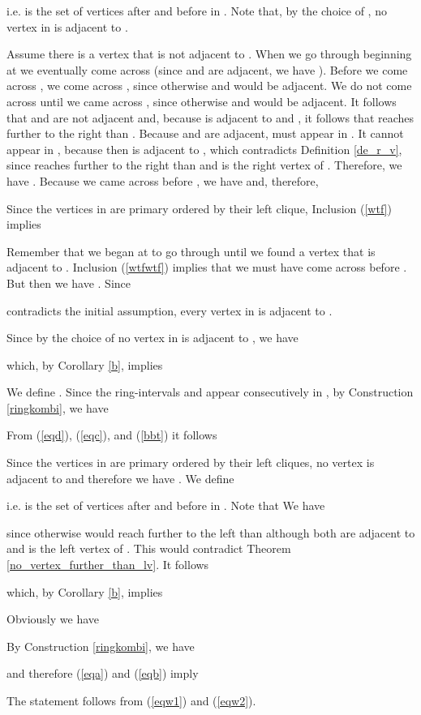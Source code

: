 \documentclass[10pt]{article}
\newenvironment{proof}{\noindent{\bf Proof~}}{\null\hfill \par\medskip}
\newcommand{\ssref}[1]{(\ref{#1})}
\begin{document}
\begin{proof}
i.e.  is the set of vertices after  and before  in .
Note that, by the choice of , no vertex in  is adjacent to .

Assume there is a vertex  that is not adjacent to .
When we go through  beginning at  we eventually come across  
(since  and  are adjacent, we have ).
Before we come across , we come across , since otherwise  and  would be adjacent.
We do not come  across  until we came across , since otherwise  and  would be adjacent.
It follows that  and  are not adjacent and, because  is adjacent to   and , it follows that  reaches further to the right than .
Because  and  are adjacent,  
must appear in .
It cannot appear in , because then  
is adjacent to ,
which contradicts Definition \ref{de_r_v}, since  reaches further to the right 
than  and  is the right vertex of .
Therefore, we have
.
Because we came across  before , we have  and, therefore,

Since the vertices in  are primary ordered by their left clique, Inclusion (\ref{wtf}) implies

Remember that we began at  
to go through  until we found a vertex  that is adjacent to .
Inclusion \ssref{wtfwtf} implies that we must  have come across  before .
But then we have .
Since
 
contradicts the initial assumption, every vertex in  is adjacent to .



Since by the choice of  no vertex in  is adjacent to , we have

which, by Corollary \ref{b}, implies

We define .
Since the ring-intervals  and  appear consecutively in , 
by Construction \ref{ringkombi}, we have

From \ssref{eqd}, \ssref{eqc}, and \ssref{bbt} it follows


Since the vertices in  are primary ordered by their left cliques, 
no vertex   is adjacent 
to  and therefore we have . We define

i.e.  is the set of vertices after  and before  in .
Note that 
We have

since otherwise  would reach further to the left than  although both are 
adjacent to  and  is the left vertex of .
This would contradict Theorem \ref{no_vertex_further_than_lv}.
It follows

which, by Corollary \ref{b}, implies 

Obviously we have 

By Construction \ref{ringkombi}, we have 

and therefore \ssref{eqa} and \ssref{eqb} imply 

The statement follows from \ssref{eqw1} and \ssref{eqw2}.
\end{proof}
\end{document}

